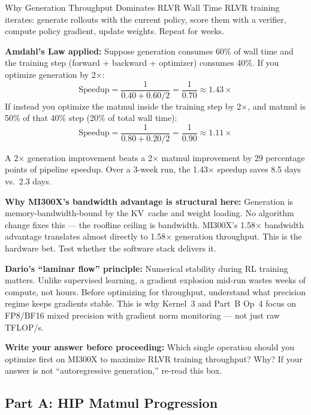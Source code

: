 \begin{thinkfirst}{Why Generation Throughput Dominates RLVR Wall Time}
RLVR training iterates: generate rollouts with the current policy, score them with a verifier, compute policy gradient, update weights. Repeat for weeks.

\textbf{Amdahl's Law applied:} Suppose generation consumes 60\% of wall time and the training step (forward + backward + optimizer) consumes 40\%. If you optimize generation by 2$\times$:
$$\text{Speedup} = \frac{1}{0.40 + 0.60/2} = \frac{1}{0.70} \approx 1.43\times$$
If instead you optimize the matmul inside the training step by 2$\times$, and matmul is 50\% of that 40\% step (20\% of total wall time):
$$\text{Speedup} = \frac{1}{0.80 + 0.20/2} = \frac{1}{0.90} \approx 1.11\times$$

A 2$\times$ generation improvement beats a 2$\times$ matmul improvement by 29 percentage points of pipeline speedup. Over a 3-week run, the 1.43$\times$ speedup saves 8.5 days vs.\ 2.3 days.

\textbf{Why MI300X's bandwidth advantage is structural here:} Generation is memory-bandwidth-bound by the KV~cache and weight loading. No algorithm change fixes this --- the roofline ceiling is bandwidth. MI300X's 1.58$\times$ bandwidth advantage translates almost directly to 1.58$\times$ generation throughput. This is the hardware bet. Test whether the software stack delivers it.

\textbf{Dario's ``laminar flow'' principle:} Numerical stability during RL training matters. Unlike supervised learning, a gradient explosion mid-run wastes weeks of compute, not hours. Before optimizing for throughput, understand what precision regime keeps gradients stable. This is why Kernel~3 and Part~B Op~4 focus on FP8/BF16 mixed precision with gradient norm monitoring --- not just raw TFLOP/s.

\textbf{Write your answer before proceeding:} Which single operation should you optimize first on MI300X to maximize RLVR training throughput? Why? If your answer is not ``autoregressive generation,'' re-read this box.
\end{thinkfirst}

\subsection{Part A: HIP Matmul Progression}

